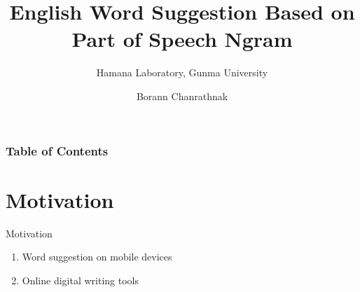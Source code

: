 \documentclass{beamer}
\title{English Word Suggestion Based on Part of Speech Ngram}
\subtitle{Hamana Laboratory, Gunma University}
\author{Borann Chanrathnak}
\begin{document}
\maketitle


\begin{frame}
\frametitle{Table of Contents}
\tableofcontents
\end{frame}

\section{Motivation}
\begin{frame}{Motivation}
    \begin{enumerate}
        \item Word suggestion on mobile devices
        \item Online digital writing tools
    \end{enumerate}
    \centering
\end{frame}
\end{document}
